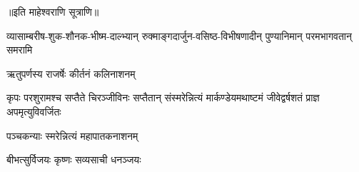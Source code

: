 \begin{center}
॥इति माहेश्वराणि सूत्राणि॥


{व्यासाम्बरीष-शुक-शौनक-भीष्म-दाल्भ्यान्}
{रुक्माङ्गदार्जुन-वसिष्ठ-विभीषणादीन्}
{पुण्यानिमान् परमभागवतान् समरामि}


{ऋतुपर्णस्य राजर्षेः कीर्तनं कलिनाशनम्}

{कृपः परशुरामश्च सप्तैते चिरञ्जीविनः}
{सप्तैतान् संस्मरेन्नित्यं मार्कण्डेयमथाष्टमं}
{जीवेद्वर्षशतं प्राज्ञ अपमृत्युविवर्जितः}

{पञ्चकन्याः स्मरेन्नित्यं महापातकनाशनम्}


{बीभत्सुर्विजयः कृष्णः सव्यसाची धनञ्जयः}





\closesection
\clearpage

\closesection
\clearpage


\closesection
\clearpage



\closesection
\clearpage




\closesection
\clearpage




\closesection
\clearpage


\end{center}
